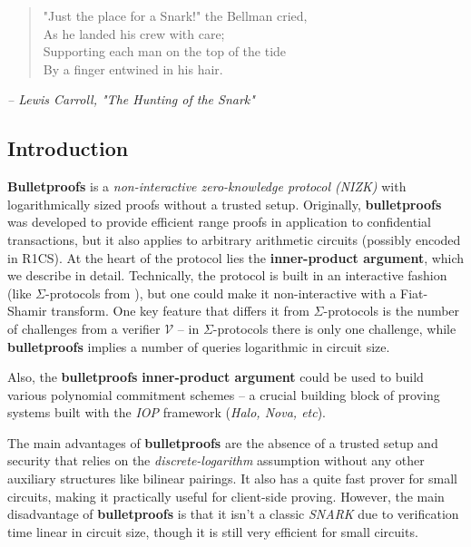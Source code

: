 \documentclass[../lecture-notes-148x210.tex]{subfiles}
\begin{document}
\begin{quote}
    \small "Just the place for a Snark!" the Bellman cried,\\
    As he landed his crew with care;\\
 Supporting each man on the top of the tide\\
    By a finger entwined in his hair.
\end{quote}
\begin{flushright}
\small \textit{-- Lewis Carroll, "The Hunting of the Snark"}
\end{flushright}

\subsection{Introduction}

\textbf{Bulletproofs} is a \textit{non-interactive zero-knowledge protocol (NIZK)} with logarithmically sized proofs without a trusted setup. Originally, \textbf{bulletproofs} was developed to provide efficient range proofs in application to confidential transactions, but it also applies to arbitrary arithmetic circuits (possibly encoded in R1CS). At the heart of the protocol lies the \textbf{inner-product argument}, which we describe in detail. Technically, the protocol is built in an interactive fashion (like $\Sigma$-protocols from ), but one could make it non-interactive with a Fiat-Shamir transform. One key feature that differs it from $\Sigma$-protocols is the number of challenges from a verifier $\mathcal{V}$ -- in $\Sigma$-protocols there is only one challenge, while \textbf{bulletproofs} implies a number of queries logarithmic in circuit size.

Also, the \textbf{bulletproofs} \textbf{inner-product argument} could be used to build various polynomial commitment schemes -- a crucial building block of proving systems built with the \textit{IOP} framework (\textit{Halo, Nova, etc}).

The main advantages of \textbf{bulletproofs} are the absence of a trusted setup and security that relies on the \textit{discrete-logarithm} assumption without any other auxiliary structures like bilinear pairings. It also has a quite fast prover for small circuits, making it practically useful for client-side proving. However, the main disadvantage of \textbf{bulletproofs} is that it isn't a classic \textit{SNARK} due to verification time linear in circuit size, though it is still very efficient for small circuits.
\end{document}
